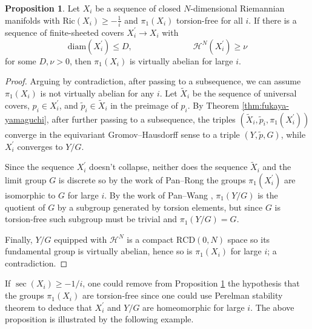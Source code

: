 \documentclass[12pt]{amsart}
\theoremstyle{definition}
\def\fnum{equation}
\newtheorem{proposition}[\fnum]{Proposition}
\numberwithin{equation}{section}
\newcommand{\diam}{{\text {diam}}}
\newcommand{\rcd}{\text{RCD}}
\newcommand{\haus}{\mathcal{H}}
\newcommand{\Ric}{\text{Ric}}
\begin{document}
\begin{proposition}\label{pro:failure-finite-sheeted-covers}
 Let $X_i$ be a sequence of closed  $N$-dimensional Riemannian manifolds with  $ \Ric (X_i) \geq - \frac{1}{i} $ and $\pi_1(X_i)$ torsion-free for all $i$. If there is a sequence of finite-sheeted covers $X_i^{\prime} \to X_i$ with 
\[  \diam (X_i^{\prime}) \leq D, \hspace{3cm} \haus^N (X_i^{\prime}) \geq \nu   \]
for some $D, \nu > 0$, then $\pi_1(X_i)$ is virtually abelian for large $i$.  
\end{proposition}
\begin{proof}
Arguing by contradiction, after passing to a subsequence, we can assume $\pi_1(X_i)$ is not virtually abelian for any $i$. Let $\tilde{X}_i$ be the sequence of universal covers, $p_i \in X_i^{\prime}$,  and $\tilde{p}_i \in \tilde{X}_i$ in the preimage of $p_i$.  By Theorem \ref{thm:fukaya-yamaguchi}, after further passing to a subsequence, the triples $(\tilde{X}_i, \tilde{p}_i, \pi_1(X_i^{\prime}))$ converge in the equivariant Gromov--Hausdorff sense to a triple $(Y, \tilde{p} , G)$, while $X_i^{\prime}$ converges to $Y / G$. 

Since the sequence $X_i^{\prime}$ doesn't collapse, neither does the sequence $\tilde{X}_i$ and the limit group $G$ is discrete so by the work of Pan--Rong %
\cite[Theorem 2.17]{pan-rong} the groups $\pi_1(X_i^{\prime})$ are isomorphic to $G$ for large $i$. By the work of Pan--Wang \cite[Theorem 1.4]{pan-wang}, $\pi_1(Y/ G)$ is the quotient of $G$ by a subgroup generated by torsion elements, but since $G$ is torsion-free such subgroup must be trivial and $\pi _1(Y/ G) = G$. 

Finally,  $Y/G$ equipped with $\mathcal{H}^N$ is a compact $\rcd (0, N)$ space so its fundamental group is virtually abelian, hence so is $\pi_1(X_i)$ for large $i$; a contradiction. 
\end{proof}

If $\sec ( X_i ) \geq -1 / i$, one could remove from Proposition \ref{pro:failure-finite-sheeted-covers}  the hypothesis that the groups $\pi_1(X_i)$ are torsion-free since one could use Perelman stability theorem \cite{kapovitch-perelman, perelman} to  deduce  that $X_i^{\prime} $ and $Y / G$ are homeomorphic for large $i$. The above proposition is illustrated by the following example. 

\color{black}
\end{document}
